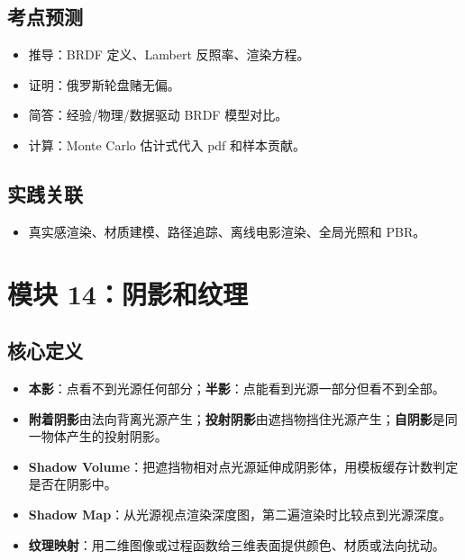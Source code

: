 \documentclass[UTF8,zihao=-4,scheme=chinese,fontset=fandol]{ctexart}
\newcommand{\key}[1]{\textbf{#1}}
\begin{document}
\subsection{考点预测}
\begin{itemize}
  \item 推导：BRDF 定义、Lambert 反照率、渲染方程。
  \item 证明：俄罗斯轮盘赌无偏。
  \item 简答：经验/物理/数据驱动 BRDF 模型对比。
  \item 计算：Monte Carlo 估计式代入 pdf 和样本贡献。
\end{itemize}

\subsection{实践关联}
\begin{itemize}
  \item 真实感渲染、材质建模、路径追踪、离线电影渲染、全局光照和 PBR。
\end{itemize}

\section{模块 14：阴影和纹理}

\subsection{核心定义}
\begin{itemize}
  \item \key{本影}：点看不到光源任何部分；\key{半影}：点能看到光源一部分但看不到全部。
  \item \key{附着阴影}由法向背离光源产生；\key{投射阴影}由遮挡物挡住光源产生；\key{自阴影}是同一物体产生的投射阴影。
  \item \key{Shadow Volume}：把遮挡物相对点光源延伸成阴影体，用模板缓存计数判定是否在阴影中。
  \item \key{Shadow Map}：从光源视点渲染深度图，第二遍渲染时比较点到光源深度。
  \item \key{纹理映射}：用二维图像或过程函数给三维表面提供颜色、材质或法向扰动。
\end{itemize}
\end{document}
